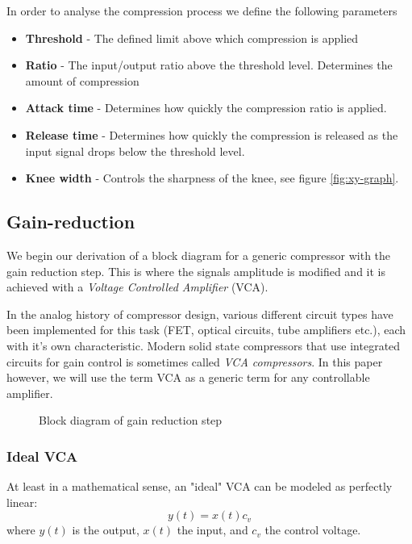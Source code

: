 \documentclass[]{article}
\begin{document}
In order to analyse the compression process we define the following parameters
\begin{itemize}
\item{\textbf{Threshold} - The defined limit above which compression is applied }
\item{\textbf{Ratio} - The input/output ratio above the threshold level. Determines the amount of compression}
\item{\textbf{Attack time} - Determines how quickly the compression ratio is applied.}
\item{\textbf{Release time} - Determines how quickly the compression is released as the input signal drops below the threshold level.}
\item{\textbf{Knee width} - Controls the sharpness of the knee, see figure \ref{fig:xy-graph}.}
\end{itemize}



\subsection{Gain-reduction}
We begin our derivation of a block diagram for a generic compressor with the gain reduction step. This is where the signals amplitude is modified and it is achieved with a \emph{Voltage Controlled Amplifier} (VCA).

In the analog history of compressor design, various different circuit types have been implemented for this task (FET, optical circuits, tube amplifiers etc.), each with it's own characteristic. Modern solid state compressors that use integrated circuits for gain control is sometimes called \emph{VCA compressors}. In this paper however, we will use the term VCA as a generic term for any controllable amplifier.

\begin{figure}[ht]
\centering

\caption{Block diagram of gain reduction step} 
\label{fig:vca-generic-blockdiagram}
\end{figure}

\subsubsection{Ideal VCA}
At least in a mathematical sense, an "ideal" VCA can be modeled as perfectly linear:
\begin{equation}
	y(t) = x(t) c_v
\end{equation}
where $y(t)$ is the output, $x(t)$ the input, and $c_v$ the control voltage.
\end{document}
